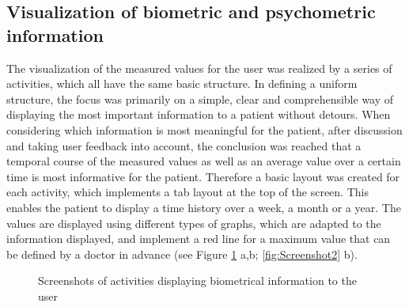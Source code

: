 \subsection{Visualization of biometric and psychometric information}
The visualization of the measured values for the user was realized by a series of activities, which all have the same basic structure. In defining a uniform structure, the focus was primarily on a simple, clear and comprehensible way of displaying the most important information to a patient without detours. When considering which information is most meaningful for the patient, after discussion and taking user feedback into account, the conclusion was reached that a temporal course of the measured values as well as an average value over a certain time is most informative for the patient. Therefore a basic layout was created for each activity, which implements a tab layout at the top of the screen. This enables the patient to display a time history over a week, a month or a year. The values are displayed using different types of graphs, which are adapted to the information displayed, and implement a red line for a maximum value that can be defined by a doctor in advance (see Figure \ref{fig:Screenshot1} a,b; \ref{fig:Screenshot2} b).

\begin{figure}[ht]
    \centering
    \caption[Screenshots of activities displaying biometrical information to the user]{Screenshots of activities displaying biometrical information to the user \endtabular}
    \label{fig:Screenshot1}
\end{figure}

